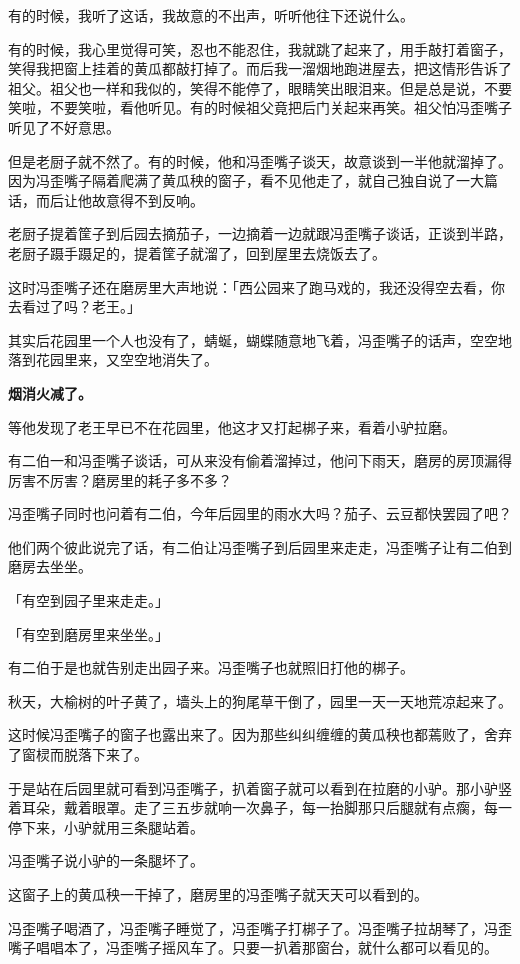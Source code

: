 \documentclass[UTF8]{ctexart}
\begin{document}
有的时候，我听了这话，我故意的不出声，听听他往下还说什么。

有的时候，我心里觉得可笑，忍也不能忍住，我就跳了起来了，用手敲打着窗子，笑得我把窗上挂着的黄瓜都敲打掉了。而后我一溜烟地跑进屋去，把这情形告诉了祖父。祖父也一样和我似的，笑得不能停了，眼睛笑出眼泪来。但是总是说，不要笑啦，不要笑啦，看他听见。有的时候祖父竟把后门关起来再笑。祖父怕冯歪嘴子听见了不好意思。

但是老厨子就不然了。有的时候，他和冯歪嘴子谈天，故意谈到一半他就溜掉了。因为冯歪嘴子隔着爬满了黄瓜秧的窗子，看不见他走了，就自己独自说了一大篇话，而后让他故意得不到反响。

老厨子提着筐子到后园去摘茄子，一边摘着一边就跟冯歪嘴子谈话，正谈到半路，老厨子蹑手蹑足的，提着筐子就溜了，回到屋里去烧饭去了。

这时冯歪嘴子还在磨房里大声地说：「西公园来了跑马戏的，我还没得空去看，你去看过了吗？老王。」

其实后花园里一个人也没有了，蜻蜒，蝴蝶随意地飞着，冯歪嘴子的话声，空空地落到花园里来，又空空地消失了。

\textbf{烟消火减了。}

等他发现了老王早已不在花园里，他这才又打起梆子来，看着小驴拉磨。

有二伯一和冯歪嘴子谈话，可从来没有偷着溜掉过，他问下雨天，磨房的房顶漏得厉害不厉害？磨房里的耗子多不多？

冯歪嘴子同时也问着有二伯，今年后园里的雨水大吗？茄子、云豆都快罢园了吧？

他们两个彼此说完了话，有二伯让冯歪嘴子到后园里来走走，冯歪嘴子让有二伯到磨房去坐坐。

「有空到园子里来走走。」

「有空到磨房里来坐坐。」

有二伯于是也就告别走出园子来。冯歪嘴子也就照旧打他的梆子。

秋天，大榆树的叶子黄了，墙头上的狗尾草干倒了，园里一天一天地荒凉起来了。

这时候冯歪嘴子的窗子也露出来了。因为那些纠纠缠缠的黄瓜秧也都蔫败了，舍弃了窗棂而脱落下来了。

于是站在后园里就可看到冯歪嘴子，扒着窗子就可以看到在拉磨的小驴。那小驴竖着耳朵，戴着眼罩。走了三五步就响一次鼻子，每一抬脚那只后腿就有点瘸，每一停下来，小驴就用三条腿站着。

冯歪嘴子说小驴的一条腿坏了。

这窗子上的黄瓜秧一干掉了，磨房里的冯歪嘴子就天天可以看到的。

冯歪嘴子喝酒了，冯歪嘴子睡觉了，冯歪嘴子打梆子了。冯歪嘴子拉胡琴了，冯歪嘴子唱唱本了，冯歪嘴子摇风车了。只要一扒着那窗台，就什么都可以看见的。
\end{document}
